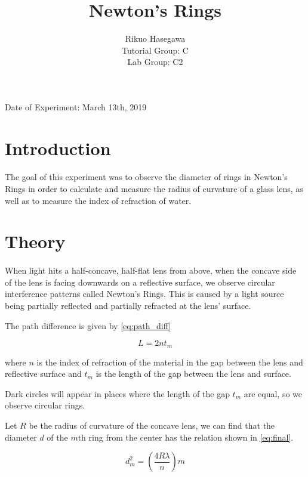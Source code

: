 \documentclass{article}
\title{Newton's Rings}
\author{ Rikuo Hasegawa
  \\ Tutorial Group: C
  \\ Lab Group: C2 }
\begin{document}
\maketitle
\thispagestyle{fancy}
\vspace*{\fill}
\parbox{\linewidth}{\centering%
Date of Experiment: March 13th, 2019
}
\newpage


\section{Introduction}
\paragraph{}
The goal of this experiment was to observe the diameter of rings in Newton's Rings in order to calculate and measure the radius of curvature of a glass lens, as well as to measure the index of refraction of water.

\section{Theory}
\paragraph{}
When light hits a half-concave, half-flat lens from above, when the concave side of the lens is facing downwards on a reflective surface, we observe circular interference patterns called Newton's Rings. This is caused by a light source being partially reflected and partially refracted at the lens' surface.

The path difference is given by \eqref{eq:path_diff}

\begin{equation}\label{eq:path_diff}
  L = 2nt_m
\end{equation}

where $n$ is the index of refraction of the material in the gap between the lens and reflective surface and $t_m$ is the length of the gap between the lens and surface.

Dark circles will appear in places where the length of the gap $t_m$ are equal, so we observe circular rings.

Let $R$ be the radius of curvature of the concave lens, we can find that the diameter $d$ of the $m$th ring from the center has the relation shown in \eqref{eq:final}.

\begin{equation}\label{eq:final}
  d_{m}^{2} = (\frac{4R\lambda}{n})m
\end{equation}
\end{document}
